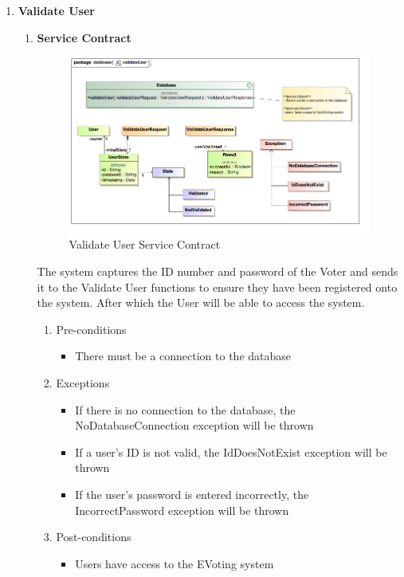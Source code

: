 \begin{enumerate}
	\item \textbf{Validate User}
		\begin{enumerate}
			\item \textbf{Service Contract}
				\begin{figure}[H]
					\centering
					\includegraphics[width=0.75\linewidth]{../Images/Database/ServiceContracts/ValidateUser_ServiceContract.png}
					\caption{Validate User Service Contract}
				\end{figure}
				
				The system captures the ID number and password of the Voter and sends it to the Validate User functions to ensure they have been registered onto the system. After which the User will be able to access the system.
				\newline
								
				\begin{enumerate}
					\item Pre-conditions
					\begin{itemize}
						\item There must be a connection to the database
					\end{itemize}
					
					\item Exceptions
					\begin{itemize}
						\item If there is no connection to the database, the NoDatabaseConnection exception will be thrown
						\item If a user's ID is not valid, the IdDoesNotExist exception will be thrown
						\item If the user's password is entered incorrectly, the IncorrectPassword exception will be thrown
					\end{itemize}
					
					\item Post-conditions
					\begin{itemize}
						\item Users have access to the EVoting system
					\end{itemize}
				\end{enumerate}
			

\end{enumerate}
\end{enumerate}
